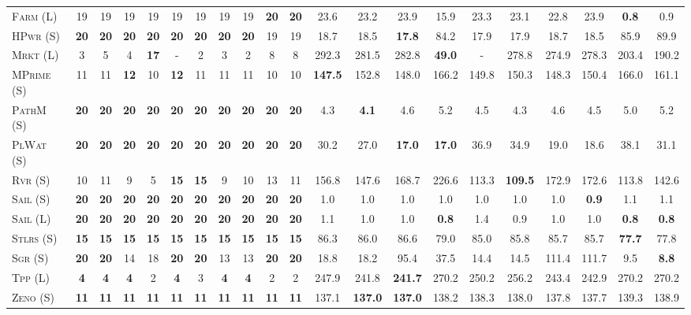 \documentclass[11pt,landscape]{article}
\begin{document}
\begin{table}[tb]
{\begin{tabular}{|l||cccccccccc||cccccccccc||}
\textsc{Farm} (L)&19&19&19&19&19&19&19&19&\textbf{20}&\textbf{20}&23.6&23.2&23.9&15.9&23.3&23.1&22.8&23.9&\textbf{0.8}&0.9\\
\textsc{HPwr} (S)&\textbf{20}&\textbf{20}&\textbf{20}&\textbf{20}&\textbf{20}&\textbf{20}&\textbf{20}&\textbf{20}&19&19&18.7&18.5&\textbf{17.8}&84.2&17.9&17.9&18.7&18.5&85.9&89.9\\
\textsc{Mrkt} (L)&3&5&4&\textbf{17}&-&2&3&2&8&8&292.3&281.5&282.8&\textbf{49.0}&-&278.8&274.9&278.3&203.4&190.2\\
\textsc{MPrime} (S)&11&11&\textbf{12}&10&\textbf{12}&11&11&11&10&10&\textbf{147.5}&152.8&148.0&166.2&149.8&150.3&148.3&150.4&166.0&161.1\\
\textsc{PathM} (S)&\textbf{20}&\textbf{20}&\textbf{20}&\textbf{20}&\textbf{20}&\textbf{20}&\textbf{20}&\textbf{20}&\textbf{20}&\textbf{20}&4.3&\textbf{4.1}&4.6&5.2&4.5&4.3&4.6&4.5&5.0&5.2\\
\textsc{PlWat} (S)&\textbf{20}&\textbf{20}&\textbf{20}&\textbf{20}&\textbf{20}&\textbf{20}&\textbf{20}&\textbf{20}&\textbf{20}&\textbf{20}&30.2&27.0&\textbf{17.0}&\textbf{17.0}&36.9&34.9&19.0&18.6&38.1&31.1\\
\textsc{Rvr} (S)&10&11&9&5&\textbf{15}&\textbf{15}&9&10&13&11&156.8&147.6&168.7&226.6&113.3&\textbf{109.5}&172.9&172.6&113.8&142.6\\
\textsc{Sail} (S)&\textbf{20}&\textbf{20}&\textbf{20}&\textbf{20}&\textbf{20}&\textbf{20}&\textbf{20}&\textbf{20}&\textbf{20}&\textbf{20}&1.0&1.0&1.0&1.0&1.0&1.0&1.0&\textbf{0.9}&1.1&1.1\\
\textsc{Sail} (L)&\textbf{20}&\textbf{20}&\textbf{20}&\textbf{20}&\textbf{20}&\textbf{20}&\textbf{20}&\textbf{20}&\textbf{20}&\textbf{20}&1.1&1.0&1.0&\textbf{0.8}&1.4&0.9&1.0&1.0&\textbf{0.8}&\textbf{0.8}\\
\textsc{Stlrs} (S)&\textbf{15}&\textbf{15}&\textbf{15}&\textbf{15}&\textbf{15}&\textbf{15}&\textbf{15}&\textbf{15}&\textbf{15}&\textbf{15}&86.3&86.0&86.6&79.0&85.0&85.8&85.7&85.7&\textbf{77.7}&77.8\\
\textsc{Sgr} (S)&\textbf{20}&\textbf{20}&14&18&\textbf{20}&\textbf{20}&13&13&\textbf{20}&\textbf{20}&18.8&18.2&95.4&37.5&14.4&14.5&111.4&111.7&9.5&\textbf{8.8}\\
\textsc{Tpp} (L)&\textbf{4}&\textbf{4}&\textbf{4}&2&\textbf{4}&3&\textbf{4}&\textbf{4}&2&2&247.9&241.8&\textbf{241.7}&270.2&250.2&256.2&243.4&242.9&270.2&270.2\\
\textsc{Zeno} (S)&\textbf{11}&\textbf{11}&\textbf{11}&\textbf{11}&\textbf{11}&\textbf{11}&\textbf{11}&\textbf{11}&\textbf{11}&\textbf{11}&137.1&\textbf{137.0}&\textbf{137.0}&138.2&138.3&138.0&137.8&137.7&139.3&138.9\\

\end{tabular}}
\end{table}
\end{document}
